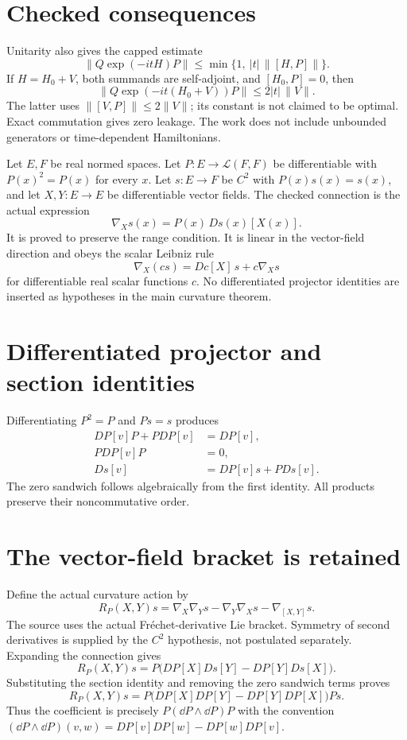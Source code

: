 \documentclass[10pt,letterpaper]{article}
\newcommand{\pageheading}[2]{\vspace*{2pt}{\small\color{ink}\textsc{#1}}\par\vspace{2pt}{\Large\bfseries #2}\par\vspace{4pt}}
\begin{document}
\section*{Checked consequences}
Unitarity also gives the capped estimate
\[
\|Q\exp(-itH)P\|\le\min\{1,\ |t|\,\|[H,P]\|\}.
\]
If $H=H_0+V$, both summands are self-adjoint, and $[H_0,P]=0$, then
\[
\|Q\exp(-it(H_0+V))P\|\le2|t|\,\|V\|.
\]
The latter uses $\|[V,P]\|\le2\|V\|$; its constant is not claimed to be optimal. Exact commutation gives zero leakage. The work does not include unbounded generators or time-dependent Hamiltonians.

\newpage
\pageheading{Item 6.4 advanced}{Actual projected differentiation and curvature}
Let $E,F$ be real normed spaces. Let $P:E\to\mathcal L(F,F)$ be differentiable with $P(x)^2=P(x)$ for every $x$. Let $s:E\to F$ be $C^2$ with $P(x)s(x)=s(x)$, and let $X,Y:E\to E$ be differentiable vector fields. The checked connection is the actual expression
\[
\nabla_Xs(x)=P(x)\,Ds(x)[X(x)].
\]
It is proved to preserve the range condition. It is linear in the vector-field direction and obeys the scalar Leibniz rule
\[
\nabla_X(cs)=Dc[X]\,s+c\nabla_Xs
\]
for differentiable real scalar functions $c$. No differentiated projector identities are inserted as hypotheses in the main curvature theorem.

\section*{Differentiated projector and section identities}
Differentiating $P^2=P$ and $Ps=s$ produces
\begin{align*}
DP[v]P+PDP[v]&=DP[v],\\
PDP[v]P&=0,\\
Ds[v]&=DP[v]s+P Ds[v].
\end{align*}
The zero sandwich follows algebraically from the first identity. All products preserve their noncommutative order.

\section*{The vector-field bracket is retained}
Define the actual curvature action by
\[
R_P(X,Y)s=\nabla_X\nabla_Ys-\nabla_Y\nabla_Xs-\nabla_{[X,Y]}s.
\]
The source uses the actual Fr\'echet-derivative Lie bracket. Symmetry of second derivatives is supplied by the $C^2$ hypothesis, not postulated separately. Expanding the connection gives
\[
R_P(X,Y)s=P\bigl(DP[X]Ds[Y]-DP[Y]Ds[X]\bigr).
\]
Substituting the section identity and removing the zero sandwich terms proves
\[
\boxed{R_P(X,Y)s=P\bigl(DP[X]DP[Y]-DP[Y]DP[X]\bigr)P s.}
\]
Thus the coefficient is precisely $P(\dd P\wedge\dd P)P$ with the convention
$(\dd P\wedge\dd P)(v,w)=DP[v]DP[w]-DP[w]DP[v]$.
\end{document}
